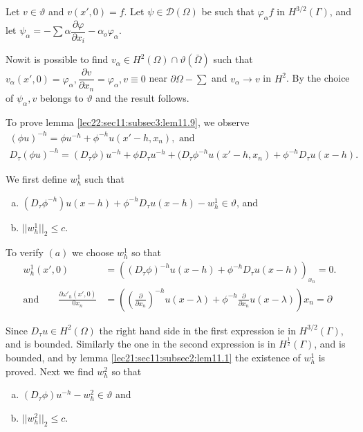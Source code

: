 Let $v \in \vartheta$ and $v (x' , 0) = f$. Let $\psi
\in \mathscr{D}(\Omega)$ be such that $\varphi_\alpha f$ in
$H^{3/2} (\Gamma)$, and let $\psi_\alpha = - \sum \alpha
\dfrac{\partial \varphi}{\partial x_i} - \alpha_o \varphi_\alpha$.  

Now\pageoriginale it is possible to find $v_\alpha \in H^2 (\Omega) \cap
\vartheta (\bar{\Omega})$ such that $v_\alpha (x', 0)=
\varphi_\alpha, \dfrac{\partial v}{\partial x_n} = \varphi_\alpha, v
\equiv 0$ near $\partial \Omega - \sum$ and $v_\alpha \to v$ in
$H^2$. By the choice of $\psi_\alpha, v$ belongs to $\vartheta$ and
the result follows.  

To prove lemma \ref{lec22:sec11:subsec3:lem11.9}, we observe
\begin{gather*}
  (\phi u)^{-h} = \phi u^{-h} + \phi^{-h} u(x' - h, x_n), \text { and } \\
  D_\tau (\phi u)^{-h} = (D_\tau \phi)u ^{-h} + \phi D_\tau u^{-h} +
  (D_\tau \phi^{-h} u(x' - h, x_n) + \phi^{-h} D_\tau u(x-h).  
\end{gather*}

We first define $w_h^1$ such that
\begin{enumerate}[a)]
\item $(D_\tau \phi^{-h}) u(x-h) + \phi^{-h} D_\tau u (x-h) - w^1_h
  \in \vartheta$,  and
\item $|| w^1_h ||_2 \leq c$. 
\end{enumerate}

To verify $(a)$ we choose $w^1_h$ so that
\begin{align*}
  w^1_h (x', 0) & = ((D_\tau \phi)^{-h} u(x-h) + \phi^{-h}D_\tau
  u(x-h))_{x_n} = 0. \\ 
  \text{and}\qquad  \frac{\partial \omega'_h (x', 0)}{0 x_n} & = \left(\left(
  \frac{\partial}{\partial x_n}\right)^{-h} u (x-\lambda) + \phi^{-h}
  \frac{\partial}{\partial x_n} u (x -\lambda)\right) x_n=\partial 
\end{align*}

Since $D_\tau u \in H^2 (\Omega)$ the right hand side in the
first expression ie in $H^{3/2} (\Gamma)$, and is bounded. Similarly
the one in the second expression is in $H^{\frac{1}{2}}(\Gamma)$, and
is bounded, and by lemma \ref{lec21:sec11:subsec2:lem11.1} the existence of $w^1_h$ is
proved. Next we find $w^2_h$ so that 
\begin{enumerate}[a)]
\item $(D_\tau \phi)u ^{-h} - w^2_h \in \vartheta$ and 
\item $|| w^2_h ||_2 \leq c$. 
\end{enumerate}

